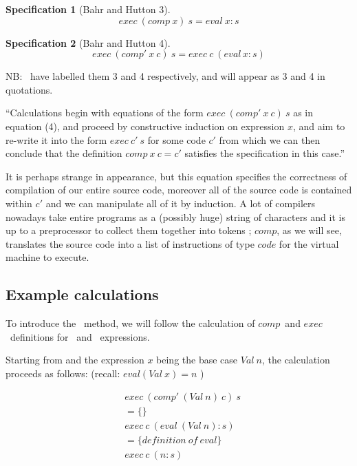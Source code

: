 \documentclass {article}
\begin{document}
\newtheorem{spec}{Specification}
\begin{spec}[Bahr and Hutton 3]
	\[ exec \  (comp \  x) \  s = eval \  x:s \]
\end{spec}
\begin{spec}[Bahr and Hutton 4]
	\[ exec \  (comp' \  x \  c) \ s = exec \  c \  (eval \, x:s) \]
\end{spec}

NB: \BH\ have labelled them 3 and 4 respectively, 
and will appear as 3 and 4 in quotations.

\newcommand{\exec}{$exec$}
\newcommand{\comp}{$comp$}
\newcommand{\compp}{$comp'$}

``Calculations begin with equations
of the form $exec \  (comp' \  x \  c) \  s$
as in equation (4),
and proceed by constructive induction on 
expression $x$, 
and aim to re-write it into the form
$exec \  c' \  s$ for some code $c'$
from which we can then conclude that the definition
$comp \  x \  c = c'$ satisfies the 
specification in this case.''\cite{bandh}

It is perhaps strange in appearance,
but this equation
specifies the correctness of compilation of our entire source code,
moreover all of the source code is contained within  $c'$
and we can manipulate all of it by induction.
A lot of compilers nowadays 
take entire programs as a (possibly huge) string of characters
and it is up to a preprocessor to collect them together into tokens \cite{dragon};
\comp, as we will see, translates the source code into a
list of instructions of type $code$ for the virtual machine to execute.

\subsection{Example calculations}

To introduce the \BH\ method,
we will follow the 
calculation of \comp\ and \exec\ definitions
for \val\ and \add\ expressions\cite[section 2.5]{bandh}.

Starting from  and the expression $x$
being the base case $Val  \ n$, 
the calculation proceeds as follows\cite{bandh}:
(recall: \( eval (Val \  x) = n  \) )

\begin{align*}
	&exec \ (comp' \ (Val \ n) \ c) \ s \\
	&= \{ \} \\
	&exec \ c \ (eval \ (Val \ n) : s) \\
	&= \{definition \ of \ eval\} \\
	&exec \ c \ (n:s)
\end{align*}
\end{document}
